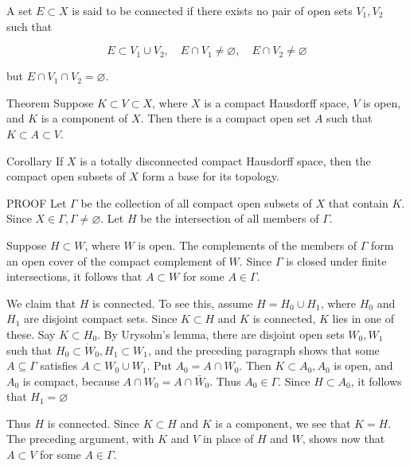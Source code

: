 \documentclass[10pt]{article}
\begin{document}
A set $E \subset X$ is said to be connected if there exists no pair of open sets $V_{1}, V_{2}$ such that

$$
E \subset V_{1} \cup V_{2}, \quad E \cap V_{1} \neq \varnothing, \quad E \cap V_{2} \neq \varnothing
$$

but $E \cap V_{1} \cap V_{2}=\varnothing$.

Theorem Suppose $K \subset V \subset X$, where $X$ is a compact Hausdorff space, $V$ is open, and $K$ is a component of $X$. Then there is a compact open set $A$ such that $K \subset A \subset V$.

Corollary If $X$ is a totally disconnected compact Hausdorff space, then the compact open subsets of $X$ form a base for its topology.

PROOF Let $\Gamma$ be the collection of all compact open subsets of $X$ that contain $K$. Since $X \in \Gamma, \Gamma \neq \varnothing$. Let $H$ be the intersection of all members of $\Gamma$.

Suppose $H \subset W$, where $W$ is open. The complements of the members of $\Gamma$ form an open cover of the compact complement of $W$. Since $\Gamma$ is closed under finite intersections, it follows that $A \subset W$ for some $A \in \Gamma$.

We claim that $H$ is connected. To see this, assume $H=H_{0} \cup H_{1}$, where $H_{0}$ and $H_{1}$ are disjoint compact sets. Since $K \subset H$ and $K$ is connected, $K$ lies in one of these. Say $K \subset H_{0}$. By Urysohn's lemma, there are disjoint open sets $W_{0}, W_{1}$ such that $H_{0} \subset \dot{W}_{0}, H_{1} \subset W_{1}$, and the preceding paragraph shows that some $A \subseteq \Gamma$ satisfies $A \subset W_{0} \cup W_{1}$. Put $A_{0}=A \cap W_{0}$. Then $K \subset A_{0}, A_{0}$ is open, and $A_{0}$ is compact, because $A \cap W_{0}=A \cap \bar{W}_{0}$. Thus $A_{0} \in \Gamma$. Since $H \subset A_{0}$, it follows that $H_{1}=\varnothing$

Thus $H$ is connected. Since $K \subset H$ and $K$ is a component, we see that $K=H$. The preceding argument, with $K$ and $V$ in place of $H$ and $W$, shows now that $A \subset V$ for some $A \in \Gamma$.
\end{document}

